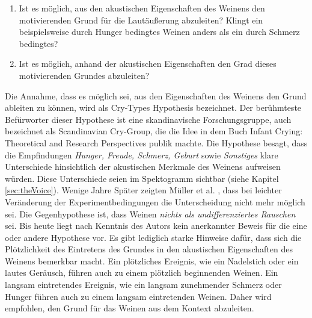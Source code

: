 \begin{enumerate}
	\item Ist es möglich, aus den akustischen Eigenschaften des Weinens den motivierenden Grund für die Lautäußerung abzuleiten?  Klingt ein beispielsweise durch Hunger bedingtes Weinen anders als ein durch Schmerz bedingtes?
	\item Ist es möglich, anhand der akustischen Eigenschaften den \glqq Grad\grqq{} dieses motivierenden Grundes abzuleiten?
\end{enumerate}

Die Annahme, dass es möglich sei, aus den Eigenschaften des Weinens den Grund ableiten zu können, wird als \glqq Cry-Types Hypothesis\grqq{} bezeichnet. Der berühmteste Befürworter dieser Hypothese ist eine skandinavische Forschungsgruppe, auch bezeichnet als \glqq Scandinavian Cry-Group\grqq , die die Idee in dem Buch \glqq Infant Crying: Theoretical and Research Perspectives\grqq \cite{crygroup} publik machte. Die Hypothese besagt, dass die Empfindungen \emph{Hunger, Freude, Schmerz, Geburt} sowie \emph{Sonstiges} klare Unterschiede hinsichtlich der akustischen Merkmale des Weinens aufweisen würden. Diese Unterschiede seien im Spektogramm sichtbar (siehe Kapitel \ref{sec:theVoice}). Wenige Jahre Später zeigten Müller et al. \cite{cryisnoise}, dass bei leichter Veränderung der Experimentbedingungen die Unterscheidung nicht mehr möglich sei. Die Gegenhypothese ist, dass Weinen \emph{nichts als undifferenziertes Rauschen} sei.\cite[S. 9 - 13]{signal} Bis heute liegt nach Kenntnis des Autors kein anerkannter Beweis für die eine oder andere Hypothese vor. Es gibt lediglich starke Hinweise dafür, dass sich die Plötzlichkeit des Eintretens des Grundes in den akustischen Eigenschaften des Weinens bemerkbar macht. Ein plötzliches Ereignis, wie ein Nadelstich oder ein lautes Geräusch, führen auch zu einem plötzlich beginnenden Weinen. Ein langsam eintretendes Ereignis, wie ein langsam zunehmender Schmerz oder Hunger führen auch zu einem langsam eintretenden Weinen. Daher wird empfohlen, den Grund für das Weinen aus dem Kontext abzuleiten.\cite[S. 17 - 19]{signal}

